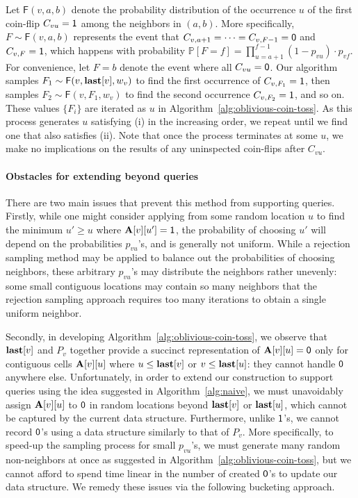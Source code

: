 Let $\mathsf{F}(v,a,b)$ denote the probability distribution of the occurrence $u$ of the first coin-flip $C_{vu} = \mathsf{1}$ among the neighbors in $(a, b)$.
More specifically, $F\sim\mathsf{F}(v,a,b)$ represents the event that $C_{v,a+1}=\cdots=C_{v,F-1}=\mathsf{0}$ and $C_{v,F}=\mathsf{1}$,
which happens with probability $\mathbb P[F=f]=\prod_{u=a+1}^{f-1} (1-p_{vu}) \cdot p_{vf}$.
For convenience, let $F = b$ denote the event where all $C_{vu}=\mathsf{0}$. Our algorithm samples $F_1\sim\mathsf{F}(v,\mathbf{last}[v],w_v)$ to find the first occurrence of $C_{v,F_1} = \mathsf{1}$, then samples $F_2\sim\mathsf{F}(v,F_1,w_v)$ to find the second occurrence $C_{v,F_2} = \mathsf{1}$, and so on.
These values $\{F_i\}$ are iterated as $u$ in Algorithm~\ref{alg:oblivious-coin-toss}.
As this process generates $u$ satisfying (i) in the increasing order, we repeat until we find one that also satisfies (ii).
Note that once the process terminates at some $u$, we make no implications on the results of any uninspected coin-flips after $C_{vu}$.

\paragraph*{Obstacles for extending beyond  queries}
There are two main issues that prevent this method from supporting  queries.
Firstly, while one might consider applying  from some random location $u$ to find the minimum $u' \geq u$ where $\mathbf{A}[v][u']=\mathsf{1}$, the probability of choosing $u'$ will depend on the probabilities $p_{vu}$'s, and is generally not uniform.
While a rejection sampling method may be applied to balance out the probabilities of choosing neighbors, these arbitrary $p_{vu}$'s may distribute the neighbors rather unevenly: some small contiguous locations may contain so many neighbors that the rejection sampling approach requires too many iterations to obtain a single uniform neighbor.

 Secondly, in developing Algorithm~\ref{alg:oblivious-coin-toss}, we observe that $\mathbf{last}[v]$ and $P_v$ together provide a succinct representation of $\mathbf{A}[v][u] = \mathsf{0}$ only for contiguous cells $\mathbf{A}[v][u]$ where $u \leq \mathbf{last}[v]$ or $v \leq \mathbf{last}[u]$: they cannot handle $\mathsf{0}$ anywhere else.
 Unfortunately, in order to extend our construction to support  queries using the idea suggested in Algorithm~\ref{alg:naive}, we must unavoidably assign $\mathbf{A}[v][u]$ to $\mathsf{0}$ in random locations beyond $\mathbf{last}[v]$ or $\mathbf{last}[u]$, which cannot be captured by the current data structure.
 Furthermore, unlike $\mathsf{1}$'s, we cannot record $\mathsf{0}$'s using a data structure similarly to that of $P_v$.
 More specifically, to speed-up the sampling process for small $p_{vu}$'s, we must generate many random non-neighbors at once as suggested in Algorithm~\ref{alg:oblivious-coin-toss}, but we cannot afford to spend time linear in the number of created $\mathsf{0}$'s to update our data structure.
 We remedy these issues via the following bucketing approach.
